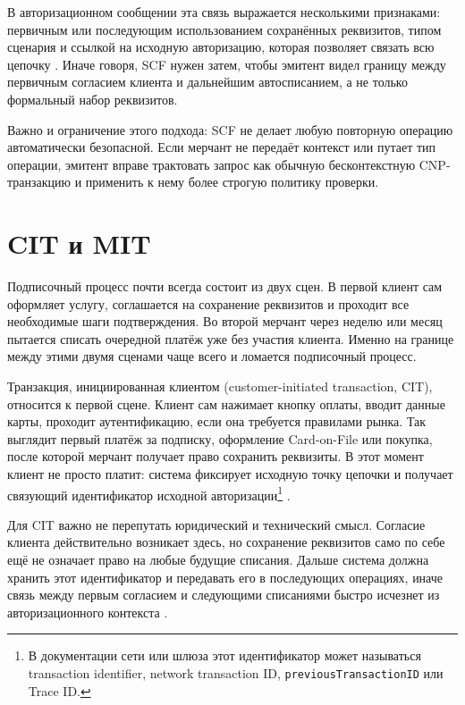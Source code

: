 В авторизационном сообщении эта связь выражается несколькими
признаками: первичным или последующим использованием сохранённых
реквизитов, типом сценария и ссылкой на исходную авторизацию, которая
позволяет связать всю цепочку \cite{mc-tpr}\cite{cybs-initial-transactions}.
Иначе говоря, SCF нужен затем, чтобы эмитент видел границу между
первичным согласием клиента и дальнейшим автосписанием, а не только
формальный набор реквизитов.

Важно и ограничение этого подхода: SCF не делает любую повторную
операцию автоматически безопасной. Если мерчант не передаёт контекст
или путает тип операции, эмитент вправе трактовать запрос как обычную
бесконтекстную CNP-транзакцию и применить к нему более строгую политику
проверки.

\section{CIT и MIT}
\label{sec:subscriptions-cit-mit}

Подписочный процесс почти всегда состоит из двух сцен. В первой клиент
сам оформляет услугу, соглашается на сохранение реквизитов и проходит
все необходимые шаги подтверждения. Во второй мерчант через неделю или
месяц пытается списать очередной платёж уже без участия клиента. Именно
на границе между этими двумя сценами чаще всего и ломается подписочный
процесс.

Транзакция, инициированная клиентом (customer-initiated transaction,
CIT), относится к первой сцене. Клиент сам нажимает кнопку оплаты,
вводит данные карты, проходит аутентификацию, если она требуется
правилами рынка. Так выглядит первый платёж за подписку, оформление
Card-on-File или покупка, после которой мерчант получает право
сохранить реквизиты. В этот момент клиент не просто платит: система
фиксирует исходную точку цепочки и получает связующий идентификатор
исходной авторизации\footnote{В документации сети или шлюза этот
идентификатор может называться transaction identifier, network
transaction ID, \texttt{previousTransactionID} или Trace ID.}
\cite{mc-tpr}\cite{cybs-initial-transactions}\cite{cybs-mc-subscription-mit}.

Для CIT важно не перепутать юридический и технический смысл. Согласие
клиента действительно возникает здесь, но сохранение реквизитов само по
себе ещё не означает право на любые будущие списания. Дальше система
должна хранить этот идентификатор и передавать его в последующих
операциях, иначе связь между первым согласием и следующими списаниями
быстро исчезнет из авторизационного контекста
\cite{mc-tpr}\cite{cybs-initial-transactions}.

